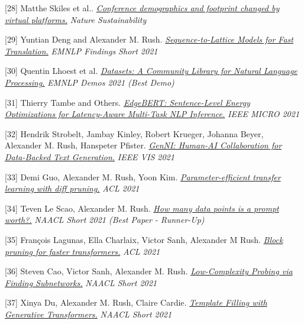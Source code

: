 \documentclass[10pt]{article}
\begin{document}
[28] \ind Matthe Skiles et al.. \emph{\href{ https://www.nature.com/articles/s41893-021-00823-2 }{ Conference demographics and footprint changed by virtual platforms.} }\emph{ Nature Sustainability }

\medskip


[29] \ind Yuntian Deng and Alexander M. Rush. \emph{\href{ https://aclanthology.org/2021.findings-emnlp.318.pdf }{ Sequence-to-Lattice Models for Fast Translation.} }\emph{ EMNLP Findings Short 2021 }

\medskip


[30] \ind Quentin Lhoest et al. \emph{\href{ https://arxiv.org/pdf/2109.02846.pdf }{ Datasets: A Community Library for Natural Language Processing.} }\emph{ EMNLP Demos 2021 (Best Demo) }

\medskip


[31] \ind Thierry Tambe and Others. \emph{\href{ https://arxiv.org/pdf/2011.14203.pdf }{ EdgeBERT: Sentence-Level Energy Optimizations for Latency-Aware Multi-Task NLP Inference.} }\emph{ IEEE MICRO 2021 }

\medskip


[32] \ind Hendrik Strobelt, Jambay Kinley, Robert Krueger, Johanna Beyer, Alexander M. Rush, Hanspeter Pfister. \emph{\href{ None }{ GenNI: Human-AI Collaboration for Data-Backed Text Generation.} }\emph{ IEEE VIS 2021 }

\medskip


[33] \ind Demi Guo, Alexander M. Rush, Yoon Kim. \emph{\href{ https://arxiv.org/pdf/2012.07463.pdf }{ Parameter-efficient transfer learning with diff pruning.} }\emph{ ACL 2021 }

\medskip


[34] \ind Teven Le Scao, Alexander M. Rush. \emph{\href{ https://aclanthology.org/2021.naacl-main.208.pdf }{ How many data points is a prompt worth?.} }\emph{ NAACL Short 2021 (Best Paper - Runner-Up) }

\medskip


[35] \ind François Lagunas, Ella Charlaix, Victor Sanh, Alexander M Rush. \emph{\href{ https://arxiv.org/pdf/2109.04838 }{ Block pruning for faster transformers.} }\emph{ ACL 2021 }

\medskip


[36] \ind Steven Cao, Victor Sanh, Alexander M. Rush. \emph{\href{ https://aclanthology.org/2021.naacl-main.74/ }{ Low-Complexity Probing via Finding Subnetworks.} }\emph{ NAACL Short 2021 }

\medskip


[37] \ind Xinya Du, Alexander M. Rush, Claire Cardie. \emph{\href{ https://aclanthology.org/2021.naacl-main.70/ }{ Template Filling with Generative Transformers.} }\emph{ NAACL Short 2021 }
\end{document}
